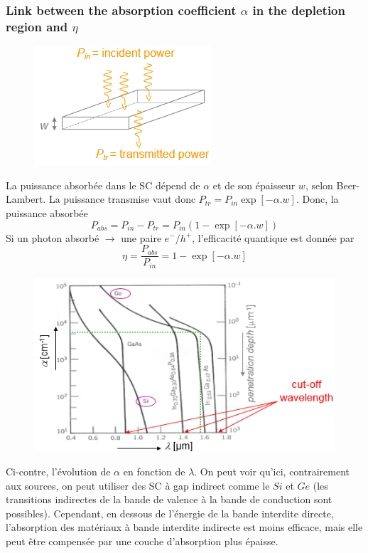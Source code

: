 \subsubsection{Link between the absorption coefficient $\alpha$ in the depletion region and $\eta$}
\begin{figure}
\vspace{-5mm}
\includegraphics[scale=0.65]{ch5/image3}
\end{figure}
La puissance absorbée dans le SC dépend de $\alpha$ et de son épaisseur $w$, selon Beer-Lambert. La
puissance transmise vaut donc ${P_{tr}} = {P_{in}}\exp [ - \alpha .w]$. Donc, la puissance
absorbée
\begin{equation}
{P_{abs}} = {P_{in}} - {P_{tr}} = {P_{in}}(1 - \exp [ - \alpha .w])
\end{equation}
Si un photon absorbé $\to$ une paire $e^-/h^+$, l'efficacité quantique est donnée par
\begin{equation}
\eta  = \frac{{{P_{abs}}}}{{{P_{in}}}} = 1 - \exp [ - \alpha .w]
\end{equation}

\begin{figure}
\vspace{-5mm}
\includegraphics[scale=0.65]{ch5/image4}
\end{figure}
Ci-contre, l'évolution de $\alpha$ en fonction de $\lambda$. On peut voir qu'ici, contrairement aux
sources, on peut utiliser des SC à gap indirect comme le $Si$ et $Ge$ (les transitions indirectes de
la bande de valence à la bande de conduction sont possibles). Cependant,  en dessous de l'énergie de
la bande interdite directe, l'absorption des matériaux à bande interdite indirecte est moins efficace,
mais elle peut être compensée par une couche d'absorption plus épaisse.\\

